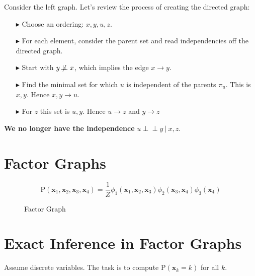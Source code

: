 \documentclass{article}
\newcommand{\prob}{\text{P}}
\newcommand{\pr}{\prob}
\renewcommand{\vec}[1]{\mathbf{#1}}
\newcommand{\bx}{\vec{x}}
\newcommand{\giv}{\ |\ }
\newcommand\indep{\!\perp\!\!\!\perp}
\newcommand\notindep{\not\!\perp\!\!\!\perp}
\begin{document}
Consider the left graph. Let's review the process of creating the directed graph:
\begin{itemize}
    \item[$\blacktriangleright$] Choose an ordering: $x, y, u, z$.
    \item[$\blacktriangleright$] For each element, consider the parent set and read
        independencies off the directed graph.
    \item[$\blacktriangleright$] Start with $y \notindep x$, which implies the edge $x \to y$.
    \item[$\blacktriangleright$] Find the minimal set for which $u$ is independent of the parents $\pi_u$.
        This is $x, y$. Hence $x, y \to u$.
    \item[$\blacktriangleright$] For $z$ this set is $u, y$. Hence $u \to z$ and $y \to z$
\end{itemize}

\textbf{We no longer have the independence} $u \indep y \giv x, z$.

\section{Factor Graphs}
\begin{equation}
    \pr(\bx_1, \bx_2, \bx_3, \bx_4) = \frac{1}{Z} \phi_1(\bx_1, \bx_2, \bx_3)
        \phi_2(\bx_3, \bx_4) \phi_3(\bx_4)
\end{equation}

\begin{figure}[h]
    \centering
    \caption{Factor Graph}
    \label{fig:factor_graph}
\end{figure}

\section{Exact Inference in Factor Graphs}
Assume discrete variables. The task is to compute $\pr(\bx_k = k)$ for all $k$.
\end{document}
